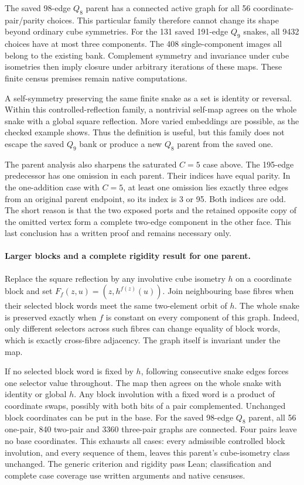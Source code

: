 \documentclass[11pt,a4paper]{article}
\begin{document}
The saved 98-edge $Q_8$ parent has a connected active graph for all
56 coordinate-pair/parity choices. This particular family therefore
cannot change its shape beyond ordinary cube symmetries.
For the 131 saved 191-edge $Q_9$ snakes, all 9432 choices have at most
three components. The 408 single-component images all belong to the
existing bank. Complement symmetry and invariance under cube isometries
then imply closure under arbitrary iterations of these maps. These
finite census premises remain native computations.

A self-symmetry preserving the same finite snake as a set is identity
or reversal. Within this controlled-reflection family, a nontrivial
self-map agrees on the whole snake with a global square reflection.
More varied embeddings are possible, as the checked example shows.
Thus the definition is useful, but this family does not escape the
saved $Q_9$ bank or produce a new $Q_8$ parent from the saved one.

The parent analysis also sharpens the saturated $C=5$ case above.
The 195-edge predecessor has one omission in each parent. Their indices
have equal parity. In the one-addition case with $C=5$, at least one
omission lies exactly three edges from an original parent endpoint,
so its index is 3 or 95. Both indices are odd. The short reason is
that the two exposed ports and the retained opposite copy of the
omitted vertex form a complete two-edge component in the other face.
This last conclusion has a written proof and remains necessary only.

\paragraph{Larger blocks and a complete rigidity result for one parent.}
Replace the square reflection by any involutive cube isometry $h$
on a coordinate block and set $F_f(z,u)=(z,h^{f(z)}(u))$.
Join neighbouring base fibres when their selected block words meet
the same two-element orbit of $h$. The whole snake is preserved
exactly when $f$ is constant on every component of this graph.
Indeed, only different selectors across such fibres can change
equality of block words, which is exactly cross-fibre adjacency.
The graph itself is invariant under the map.

If no selected block word is fixed by $h$, following consecutive
snake edges forces one selector value throughout. The map then agrees
on the whole snake with identity or global $h$. Any block involution
with a fixed word is a product of coordinate swaps, possibly with
both bits of a pair complemented. Unchanged block coordinates can
be put in the base. For the saved 98-edge $Q_8$ parent, all 56
one-pair, 840 two-pair and 3360 three-pair graphs are connected.
Four pairs leave no base coordinates. This exhausts all cases:
every admissible controlled block involution, and every sequence of
them, leaves this parent's cube-isometry class unchanged. The generic
criterion and rigidity pass Lean; classification and complete case
coverage use written arguments and native censuses.
\end{document}
